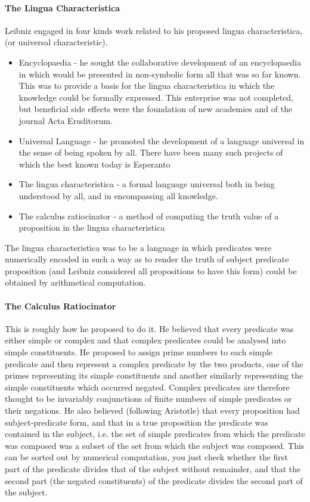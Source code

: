 \documentclass[10pt,titlepage]{book}
\begin{document}
\paragraph{The Lingua Characteristica}
Leibniz engaged in four kinds work related to his proposed lingua characteristica, (or universal characteristic).
\begin{itemize}
\item Encyclopaedia - he sought the collaborative development of an encyclopaedia in which would be presented in non-symbolic form all that was so far known. This was to provide a basis for the lingua characteristica in which the knowledge could be formally expressed. This enterprise was not completed, but beneficial side effects were the foundation of new academies and of the journal Acta Eruditorum.
\item Universal Language - he promoted the development of a language universal in the sense of being spoken by all. There have been many such projects of which the best known today is Esperanto
\item The lingua characteristica - a formal language universal both in being understood by all, and in encompassing all knowledge.
\item The calculus ratiocinator - a method of computing the truth value of a proposition in the lingua characteristica
\end{itemize}

  The lingua characteristica was to be a language in which predicates were numerically encoded in such a way as to render the truth of subject predicate proposition (and Leibniz considered all propositions to have this form) could be obtained by arithmetical computation.

\paragraph{The Calculus Ratiocinator}
This is roughly how he proposed to do it. He believed that every predicate was either simple or complex and that complex predicates could be analysed into simple constituents. He proposed to assign prime numbers to each simple predicate and then represent a complex predicate by the two products, one of the primes representing its simple constituents and another similarly representing the simple constituents which occurred negated.
Complex predicates are therefore thought to be invariably conjunctions of finite numbers of simple predicates or their negations.
He also believed (following Aristotle) that every proposition had subject-predicate form, and that in a true proposition the predicate was contained in the subject, i.e. the set of simple predicates from which the predicate was composed was a subset of the set from which the subject was composed. This can be sorted out by numerical computation, you just check whether the first part of the predicate divides that of the subject without remainder, and that the second part (the negated constituents) of the predicate divides the second part of the subject.
\end{document}
